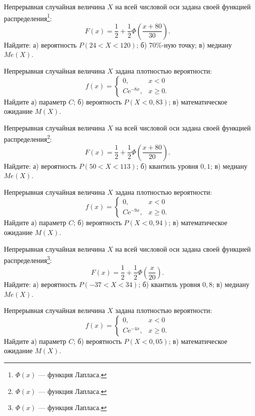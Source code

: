 \vfill

\newpage\setcounter{zad}{0}

\z Непрерывная случайная величина $X$ на всей числовой оси задана своей функцией распределения\footnote{$\Phi(x)$ --- функция Лапласа.}: $$ F(x) = \frac{1}{2} + \frac{1}{2}\Phi\left( \frac{x + 80}{30} \right). $$ Найдите: а) вероятность $P(24 < X < 120)$; б) $70\%$-ную точку; в) медиану $Me(X)$.


\vfill

\z Непрерывная случайная величина $X$ задана плотностью вероятности: $$ f(x) = \begin{cases}0, & x < 0 \\ C\mathrm{e}^{-8x}, & x \geqslant 0.\end{cases} $$ Найдите а) параметр $C$; б) вероятность $P(X < 0{,}83)$; в) математическое ожидание $M(X)$.
 

\vfill

\newpage\setcounter{zad}{0}

\z Непрерывная случайная величина $X$ на всей числовой оси задана своей функцией распределения\footnote{$\Phi(x)$ --- функция Лапласа.}: $$ F(x) = \frac{1}{2} + \frac{1}{2}\Phi\left( \frac{x + 80}{20} \right). $$ Найдите: а) вероятность $P(50 < X < 113)$; б) квантиль уровня $0{,}1$; в) медиану $Me(X)$.


\vfill

\z Непрерывная случайная величина $X$ задана плотностью вероятности: $$ f(x) = \begin{cases}0, & x < 0 \\ C\mathrm{e}^{-9x}, & x \geqslant 0.\end{cases} $$ Найдите а) параметр $C$; б) вероятность $P(X < 0{,}94)$; в) математическое ожидание $M(X)$.
 

\vfill

\newpage\setcounter{zad}{0}

\z Непрерывная случайная величина $X$ на всей числовой оси задана своей функцией распределения\footnote{$\Phi(x)$ --- функция Лапласа.}: $$ F(x) = \frac{1}{2} + \frac{1}{2}\Phi\left( \frac{x}{20} \right). $$ Найдите: а) вероятность $P(-37 < X < 34)$; б) квантиль уровня $0{,}8$; в) медиану $Me(X)$.


\vfill

\z Непрерывная случайная величина $X$ задана плотностью вероятности: $$ f(x) = \begin{cases}0, & x < 0 \\ C\mathrm{e}^{-4x}, & x \geqslant 0.\end{cases} $$ Найдите а) параметр $C$; б) вероятность $P(X < 0{,}05)$; в) математическое ожидание $M(X)$.
 

